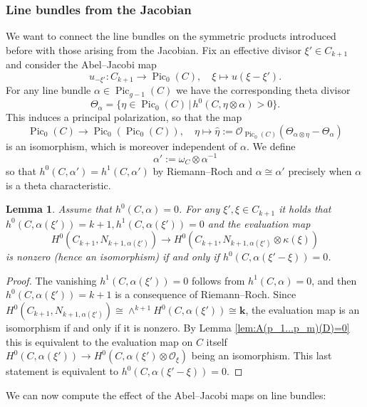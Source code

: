 \documentclass[12pt]{amsart}
\newcounter{thmcounter}
\numberwithin{equation}{section}
\numberwithin{thmcounter}{section}
\newtheorem{lemma}[thmcounter]{Lemma}
\theoremstyle{definition}
\theoremstyle{claim}
\newcommand{\kk}{\mathbf{k}}
\newcommand{\sO}{\mathscr{O}}
\DeclareMathOperator{\Pic}{Pic}
\begin{document}
\subsubsection{Line bundles from the Jacobian}
We want to connect the line bundles on the symmetric products introduced before with those arising from the  Jacobian.
Fix an effective divisor  $\xi'\in C_{k+1}$ and consider the Abel--Jacobi map
\[ u_{-\xi'} \colon C_{k+1} \longrightarrow \operatorname{Pic}_0(C), \quad  \xi\longmapsto u(\xi-\xi').\]
For any line bundle $\alpha\in \Pic_{g-1}(C)$ we have the corresponding theta divisor
\[ \Theta_{\alpha} = \{\eta\in \Pic_0(C) \,|\, h^0(C,\eta\otimes\alpha) > 0\}. \]
This induces a principal polarization, so that the map
\[ \Pic_0(C) \longrightarrow \Pic_0(\Pic_0(C)), \quad \eta \longmapsto \widehat{\eta} := \sO_{\Pic_0(C)}(\Theta_{\alpha\otimes\eta} - \Theta_{\alpha})\]
is an isomorphism, which is moreover independent of $\alpha$.  We  define 
\[ \alpha' := \omega_C\otimes \alpha^{-1} \]
so that $h^0(C,\alpha')=h^1(C,\alpha')$ by Riemann--Roch and  $\alpha\cong \alpha'$ precisely when $\alpha$ is a theta characteristic.


\begin{lemma}\label{lem:alphamap1}
	Assume that $h^0(C,\alpha)=0$. For any $\xi',\xi\in C_{k+1}$ it holds that $h^0(C,\alpha(\xi'))=k+1, h^1(C,\alpha(\xi'))=0$ and the evaluation map
	\[ H^0(C_{k+1},N_{k+1,\alpha(\xi')}) \longrightarrow H^0(C_{k+1},N_{k+1,\alpha(\xi')} \otimes \kappa(\xi))\]
	is nonzero  (hence an isomorphism) if and only if $h^0(C,\alpha(\xi'-\xi))=0$.
\end{lemma}
\begin{proof}
	The vanishing $h^1(C,\alpha(\xi'))=0$ follows from $h^1(C,\alpha)=0$, and then $h^0(C,\alpha(\xi'))=k+1$ is a consequence of Riemann--Roch. Since $H^0(C_{k+1},N_{k+1,\alpha(\xi')})\cong \wedge^{k+1}H^0(C,\alpha(\xi')) \cong \kk$, the evaluation map is an isomorphism if and only if it is nonzero.  By Lemma \ref{lem:A(p_1...p_m)(D)=0} this is equivalent to the evaluation map on $C$ itself $H^0(C,\alpha(\xi')) \to H^0(C,\alpha(\xi')\otimes \sO_{\xi})$ being an isomorphism. This last statement is equivalent to $h^0(C,\alpha(\xi'-\xi))=0$.
\end{proof}


We can now compute the effect of the Abel--Jacobi maps on line bundles:
\end{document}
